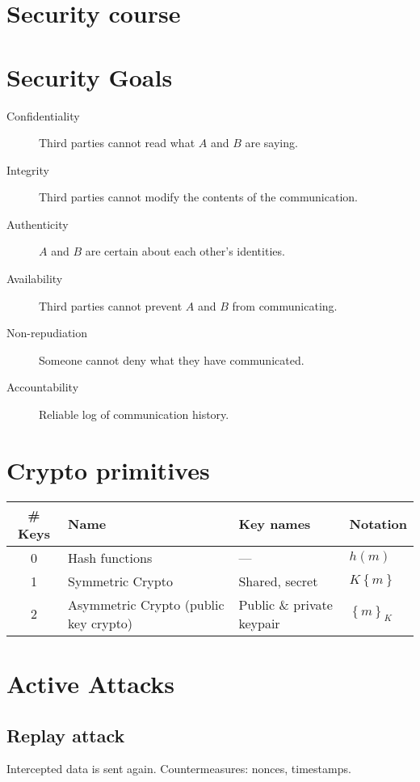 \documentclass{article}
\begin{document}
\section {Security course}
\section{Security Goals}

\begin{description}
  \item[Confidentiality] Third parties cannot read what $A$ and $B$ are saying.
  \item[Integrity] Third parties cannot modify the contents of the communication.
  \item[Authenticity] $A$ and $B$ are certain about each other's identities.
  \item[Availability] Third parties cannot prevent $A$ and $B$ from communicating.
  \item[Non-repudiation] Someone cannot deny what they have communicated.
  \item[Accountability] Reliable log of communication history.
\end{description}

\section{Crypto primitives}

\begin{tabular}[h]{c||p{100pt}|l|l}
  \bf \# Keys & \bf Name & \bf Key names & \bf Notation \\ \hline \hline
  0 & Hash functions & --- & $h(m)$ \\ \hline
  1 & Symmetric Crypto & Shared, secret & $K\left\{ m \right\}$  \\\hline
  2 & Asymmetric Crypto (public key crypto) & Public \& private keypair & $\left\{ m \right\}_K$ \\
\end{tabular}

\section{Active Attacks}

\subsection{Replay attack}

Intercepted data is sent again. Countermeasures: nonces, timestamps.
\end{document}
